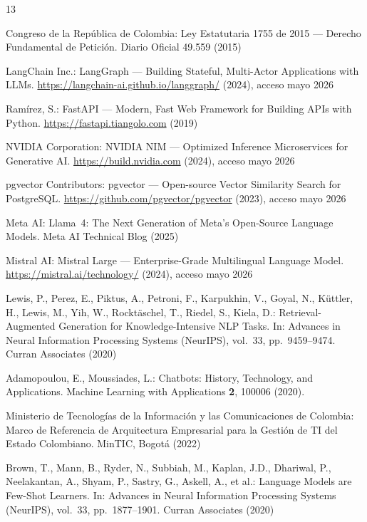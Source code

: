 \documentclass[runningheads]{llncs}
\begin{document}
\begin{thebibliography}{13}

Congreso de la República de Colombia: Ley Estatutaria 1755 de 2015 — Derecho Fundamental de Petición. Diario Oficial 49.559 (2015)

LangChain Inc.: LangGraph — Building Stateful, Multi-Actor Applications with LLMs. \url{https://langchain-ai.github.io/langgraph/} (2024), acceso mayo 2026

Ramírez, S.: FastAPI — Modern, Fast Web Framework for Building APIs with Python. \url{https://fastapi.tiangolo.com} (2019)

NVIDIA Corporation: NVIDIA NIM — Optimized Inference Microservices for Generative AI. \url{https://build.nvidia.com} (2024), acceso mayo 2026

pgvector Contributors: pgvector — Open-source Vector Similarity Search for PostgreSQL. \url{https://github.com/pgvector/pgvector} (2023), acceso mayo 2026

Meta AI: Llama~4: The Next Generation of Meta's Open-Source Language Models. Meta AI Technical Blog (2025)

Mistral AI: Mistral Large — Enterprise-Grade Multilingual Language Model. \url{https://mistral.ai/technology/} (2024), acceso mayo 2026

Lewis, P., Perez, E., Piktus, A., Petroni, F., Karpukhin, V., Goyal, N., Küttler, H., Lewis, M., Yih, W., Rocktäschel, T., Riedel, S., Kiela, D.: Retrieval-Augmented Generation for Knowledge-Intensive NLP Tasks. In: Advances in Neural Information Processing Systems (NeurIPS), vol.~33, pp.~9459--9474. Curran Associates (2020)

Adamopoulou, E., Moussiades, L.: Chatbots: History, Technology, and Applications. Machine Learning with Applications \textbf{2}, 100006 (2020). 

Ministerio de Tecnologías de la Información y las Comunicaciones de Colombia: Marco de Referencia de Arquitectura Empresarial para la Gestión de TI del Estado Colombiano. MinTIC, Bogotá (2022)

Brown, T., Mann, B., Ryder, N., Subbiah, M., Kaplan, J.D., Dhariwal, P., Neelakantan, A., Shyam, P., Sastry, G., Askell, A., et al.: Language Models are Few-Shot Learners. In: Advances in Neural Information Processing Systems (NeurIPS), vol.~33, pp.~1877--1901. Curran Associates (2020)


\end{thebibliography}
\end{document}
